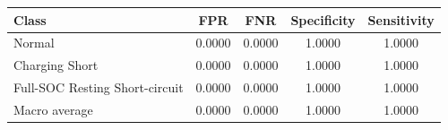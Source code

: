 \begin{tabular}{lcccc}
\hline
Class & FPR & FNR & Specificity & Sensitivity \\
\hline
Normal & 0.0000 & 0.0000 & 1.0000 & 1.0000 \\
Charging Short & 0.0000 & 0.0000 & 1.0000 & 1.0000 \\
Full-SOC Resting Short-circuit & 0.0000 & 0.0000 & 1.0000 & 1.0000 \\
Macro average & 0.0000 & 0.0000 & 1.0000 & 1.0000 \\
\hline
\end{tabular}
